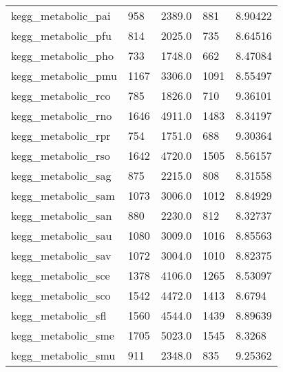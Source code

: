 \begin{longtable}{lllll}
 kegg\_metabolic\_pai                                 & 958        & 2389.0      & 881   & 8.90422    \\
 kegg\_metabolic\_pfu                                 & 814        & 2025.0      & 735   & 8.64516    \\
 kegg\_metabolic\_pho                                 & 733        & 1748.0      & 662   & 8.47084    \\
 kegg\_metabolic\_pmu                                 & 1167       & 3306.0      & 1091  & 8.55497    \\
 kegg\_metabolic\_rco                                 & 785        & 1826.0      & 710   & 9.36101    \\
 kegg\_metabolic\_rno                                 & 1646       & 4911.0      & 1483  & 8.34197    \\
 kegg\_metabolic\_rpr                                 & 754        & 1751.0      & 688   & 9.30364    \\
 kegg\_metabolic\_rso                                 & 1642       & 4720.0      & 1505  & 8.56157    \\
 kegg\_metabolic\_sag                                 & 875        & 2215.0      & 808   & 8.31558    \\
 kegg\_metabolic\_sam                                 & 1073       & 3006.0      & 1012  & 8.84929    \\
 kegg\_metabolic\_san                                 & 880        & 2230.0      & 812   & 8.32737    \\
 kegg\_metabolic\_sau                                 & 1080       & 3009.0      & 1016  & 8.85563    \\
 kegg\_metabolic\_sav                                 & 1072       & 3004.0      & 1010  & 8.82375    \\
 kegg\_metabolic\_sce                                 & 1378       & 4106.0      & 1265  & 8.53097    \\
 kegg\_metabolic\_sco                                 & 1542       & 4472.0      & 1413  & 8.6794     \\
 kegg\_metabolic\_sfl                                 & 1560       & 4544.0      & 1439  & 8.89639    \\
 kegg\_metabolic\_sme                                 & 1705       & 5023.0      & 1545  & 8.3268     \\
 kegg\_metabolic\_smu                                 & 911        & 2348.0      & 835   & 9.25362    \\

\end{longtable}
